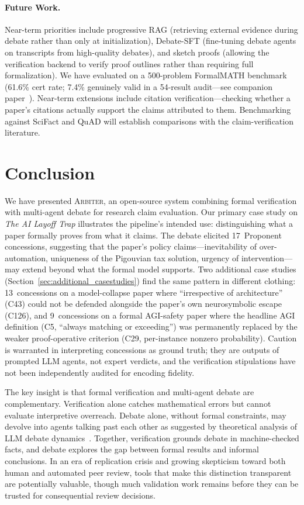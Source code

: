 \documentclass[11pt]{article}
\newcommand{\arbiter}{\textsc{Arbiter}}
\begin{document}
\paragraph{Future Work.}
Near-term priorities include progressive RAG (retrieving external evidence during debate rather than only at initialization), Debate-SFT (fine-tuning debate agents on transcripts from high-quality debates), and sketch proofs (allowing the verification backend to verify proof outlines rather than requiring full formalization).
We have evaluated on a 500-problem FormalMATH benchmark (61.6\% cert rate; 7.4\% genuinely valid in a 54-result audit---see companion paper~\cite{arbiterpaperA}). Near-term extensions include citation verification---checking whether a paper's citations actually support the claims attributed to them.
Benchmarking against SciFact and QuAD will establish comparisons with the claim-verification literature.


\section{Conclusion}
\label{sec:conclusion}

We have presented \arbiter{}, an open-source system combining formal verification with multi-agent debate for research claim evaluation.
Our primary case study on \emph{The AI Layoff Trap} illustrates the pipeline's intended use: distinguishing what a paper formally proves from what it claims. The debate elicited 17~Proponent concessions, suggesting that the paper's policy claims---inevitability of over-automation, uniqueness of the Pigouvian tax solution, urgency of intervention---may extend beyond what the formal model supports. Two additional case studies (Section~\ref{sec:additional_casestudies}) find the same pattern in different clothing: 13~concessions on a model-collapse paper where ``irrespective of architecture'' (C43) could not be defended alongside the paper's own neurosymbolic escape (C126), and 9~concessions on a formal AGI-safety paper where the headline AGI definition (C5, ``always matching or exceeding'') was permanently replaced by the weaker proof-operative criterion (C29, per-instance nonzero probability). Caution is warranted in interpreting concessions as ground truth; they are outputs of prompted LLM agents, not expert verdicts, and the verification stipulations have not been independently audited for encoding fidelity.

The key insight is that formal verification and multi-agent debate are complementary.
Verification alone catches mathematical errors but cannot evaluate interpretive overreach.
Debate alone, without formal constraints, may devolve into agents talking past each other as suggested by theoretical analysis of LLM debate dynamics~\cite{debateskepticism2025}.
Together, verification grounds debate in machine-checked facts, and debate explores the gap between formal results and informal conclusions.
In an era of replication crisis and growing skepticism toward both human and automated peer review, tools that make this distinction transparent are potentially valuable, though much validation work remains before they can be trusted for consequential review decisions.
\end{document}
